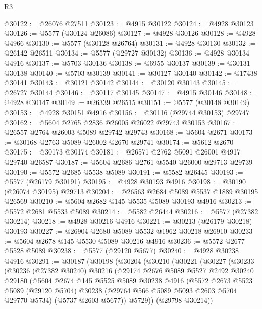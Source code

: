 \begin{lexlean}{R3}
\begin{coremodule}
@30122 := @26076 @27511
@30123 := @4915 @30122
@30124 := @4928 @30123
@30126 := @5577 (@30124 @26086)
@30127 := @4928 @30126
@30128 := @4928 @4966
@30130 := @5577 (@30128 @26764)
@30131 := @4928 @30130
@30132 := @26142 @26511
@30134 := @5577 (@29727 @30132)
@30136 := @4928 @30134 @4916
@30137 := @5703 @30136
@30138 := @6955 @30137
@30139 := @30131 @30138
@30140 := @5703 @30139
@30141 := @30127 @30140
@30142 := @17438 @30141
@30143 := @30121 @30142
@30144 := @30120 @30143
@30145 := @26727 @30144
@30146 := @30117 @30145
@30147 := @4915 @30146
@30148 := @4928 @30147
@30149 := @26339 @26515
@30151 := @5577 (@30148 @30149)
@30153 := @4928 @30151 @4916
@30156 := @30116 (@29744 @30153) @29747
@30162 := @5604 @2765 @2836 @26005 @26022 @29743 @30153
@30167 := @26557 @2764 @26003 @5089 @29742 @29743
@30168 := @5604 @2671
@30173 := @30168 @2763 @5089 @26002 @2670 @29741
@30174 := @5612 @2670
@30175 := @30173 @30174
@30181 := @26571 @2762 @5091 @26001 @4917 @29740 @26587
@30187 := @5604 @2686 @2761 @5540 @26000 @29713 @29739
@30190 := @5572 @2685 @5538 @5089
@30191 := @5582 @26445
@30193 := @5577 (@26179 @30191)
@30195 := @4928 @30193 @4916
@30198 := @30190 (@26074 @30195) @29713
@30204 := @26563 @2684 @5089 @5537 @1889 @30195 @26569
@30210 := @5604 @2682 @145 @5535 @5089 @30193 @4916
@30213 := @5572 @2681 @5533 @5089
@30214 := @5582 @26444
@30216 := @5577 (@27382 @30214)
@30218 := @4928 @30216 @4916
@30221 := @30213 (@26179 @30218) @30193
@30227 := @26904 @2680 @5089 @5532 @1962 @30218 @26910
@30233 := @5604 @2678 @145 @5530 @5089 @30216 @4916
@30236 := @5572 @2677 @5528 @5089
@30238 := @5577 (@29120 @5677)
@30240 := @4928 @30238 @4916
@30291 := @30187
    (@30198
      (@30204
        (@30210
          (@30221
            (@30227
              (@30233
                (@30236
                  (@27382 @30240)
                  @30216
                  (@29174
                    @2676
                    @5089
                    @5527
                    @2492
                    @30240
                    @29180
                    (@5604
                      @2674
                      @145
                      @5525
                      @5089
                      @30238
                      @4916
                      (@5572
                        @2673
                        @5523
                        @5089
                        (@29120 @5704)
                        @30238
                        (@29764 @566 @5089 @5093 @2603 @5704 @29770 @5734)
                        (@5737 @2603 @5677))
                      @5729))
                  (@29798 @30214))

\end{coremodule}
\end{lexlean}
